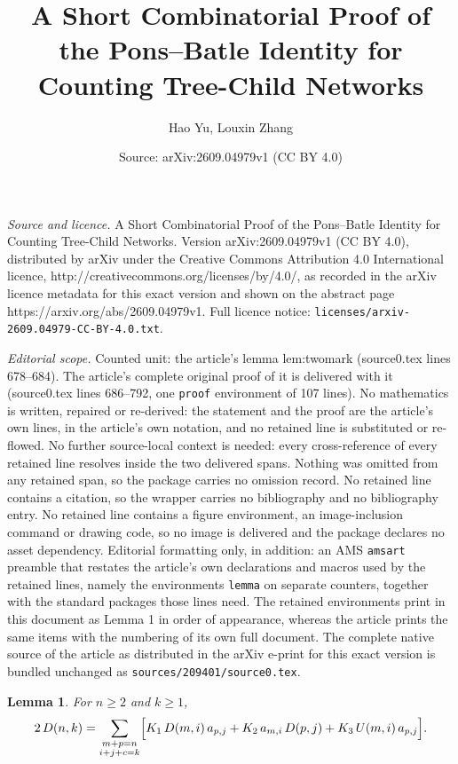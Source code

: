 \documentclass[10pt,a4paper]{amsart}
\title{A Short Combinatorial Proof of the Pons--Batle Identity for Counting Tree-Child Networks}
\author{Hao Yu, Louxin Zhang}
\date{Source: arXiv:2609.04979v1 (CC BY 4.0)}
\newtheorem{lemma}{Lemma}
\begin{document}
\maketitle

\noindent\emph{Source and licence.} A Short Combinatorial Proof of the Pons--Batle Identity for Counting Tree-Child Networks. Version arXiv:2609.04979v1 (CC BY 4.0), distributed by arXiv under the Creative Commons Attribution 4.0 International licence, http://creativecommons.org/licenses/by/4.0/, as recorded in the arXiv licence metadata for this exact version and shown on the abstract page https://arxiv.org/abs/2609.04979v1. Full licence notice: \texttt{licenses/arxiv-2609.04979-CC-BY-4.0.txt}.\par\smallskip

\noindent\textit{Editorial scope.} Counted unit: the article's lemma lem:twomark (source0.tex lines 678--684). The article's complete original proof of it is delivered with it (source0.tex lines 686--792, one \texttt{proof} environment of 107 lines). No mathematics is written, repaired or re-derived: the statement and the proof are the article's own lines, in the article's own notation, and no retained line is substituted or re-flowed.  No further source-local context is needed: every cross-reference of every retained line resolves inside the two delivered spans.  Nothing was omitted from any retained span, so the package carries no omission record.  No retained line contains a citation, so the wrapper carries no bibliography and no bibliography entry.  No retained line contains a figure environment, an image-inclusion command or drawing code, so no image is delivered and the package declares no asset dependency.  Editorial formatting only, in addition: an AMS \texttt{amsart} preamble that restates the article's own declarations and macros used by the retained lines, namely the environments \texttt{lemma} on separate counters, together with the standard packages those lines need.  The retained environments print in this document as Lemma 1 in order of appearance, whereas the article prints the same items with the numbering of its own full document.  The complete native source of the article as distributed in the arXiv e-print for this exact version is bundled unchanged as \texttt{sources/209401/source0.tex}.
\begin{lemma} \label{lem:twomark}
For $n\ge2$ and $k\ge1$,
\begin{eqnarray}
 2\,D(n,k)=\sum_{\substack{m+p=n\\ i+j+c=k}}
  \Bigl[K_1\,D(m,i)\,a_{p, j}+K_2\,a_{m, i}\,D(p,j)+K_3\,U(m,i)\,a_{p, j}\Bigr]. \label{eq:twomark}
\end{eqnarray}
\end{lemma}
\end{document}
